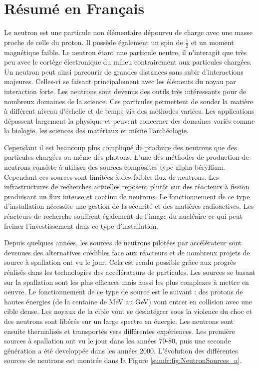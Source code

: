 \chapter*{Résumé en Français}
%

Le neutron est une particule non élémentaire dépourvu de charge avec une masse proche de celle du proton. Il possède également un spin de $\frac{1}{2}$ et un moment magnétique faible. Le neutron étant une particule neutre, il n'interagit que très peu avec le cortège électronique du milieu contrairement aux particules chargées. Un neutron peut ainsi parcourir de grandes distances sans subir d’interactions majeures. Celles-ci se faisant principalement avec les éléments du noyau par interaction forte. Les neutrons sont devenus des outils très intéressants pour de nombreux domaines de la science. Ces particules permettent de sonder la matière à différent niveau d'échelle et de temps via des méthodes variées. Les applications dépassent largement la physique et peuvent concerner des domaines variés comme la biologie, les sciences des matériaux et même l'archéologie.

Cependant il est beaucoup plus compliqué de produire des neutrons que des particules chargées ou même des photons. L'une des méthodes de production de neutrons consiste à utiliser des sources composites type alpha-béryllium. Cependant ces sources sont limitées à des faibles flux de neutrons. Les infrastructures de recherches actuelles reposent plutôt sur des réacteurs à fission produisant un flux intense et continu de neutrons.
Le fonctionnement de ce type d’installation nécessite une gestion de la sécurité et des matières radioactives. Les réacteurs de recherche souffrent également de l’image du nucléaire ce qui peut freiner l’investissement dans ce type d’installation.

Depuis quelques années, les sources de neutrons pilotées par accélérateur sont devenues des alternatives crédibles face aux réacteurs et de nombreux projets de source à spallation ont vu le jour. Cela est rendu possible grâce aux progrès réalisés dans les technologies des accélérateurs de particules. Les sources se basant sur la spallation sont les plus efficaces mais aussi les plus complexes à mettre en oeuvre. Le fonctionnement de ce type de source est le suivant : des protons de hautes énergies (de la centaine de MeV au GeV) vont entrer en collision avec une cible dense. Les noyaux de la cible vont se désintégrer sous la violence du choc et des neutrons sont libérés sur un large spectre en énergie. Les neutrons sont ensuite thermalisés et transportés vers différentes expériences. Les première sources à spallation ont vu le jour dans les années 70-80, puis une seconde génération a été developpée dans les années 2000. L'évolution des différentes sources de neutrons est montrée dans la Figure \ref{sumfr:fig:NeutronSources_a}.


